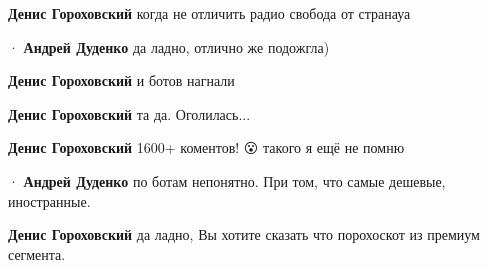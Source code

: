 \begin{itemize}
\begin{itemize}
\textbf{Денис Гороховский} когда не отличить радио свобода от странауа

 
  · 
\textbf{Андрей Дуденко} да ладно, отлично же подожгла)

 
\textbf{Денис Гороховский} и ботов нагнали

 
\textbf{Денис Гороховский} та да. Оголилась...

 
\textbf{Денис Гороховский} 1600+ коментов! 😮 такого я ещё не помню 🤔

 
  · 
\textbf{Андрей Дуденко} по ботам непонятно. При том, что самые дешевые, иностранные.

 
\textbf{Денис Гороховский} да ладно, Вы хотите сказать что порохоскот из премиум сегмента.

 

\end{itemize}
\end{itemize}
